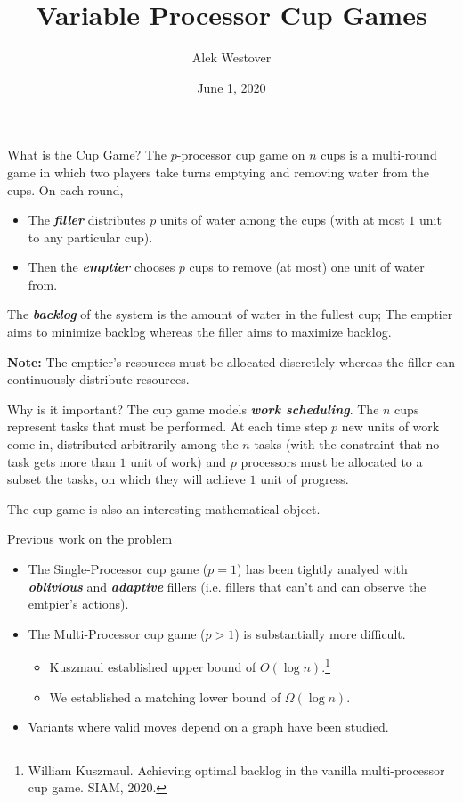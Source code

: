 \documentclass[xcolor=x11names, svgnames, rgb]{beamer}
\title{Variable Processor Cup Games}
\author{Alek Westover}
\institute{Belmont High School}
\date{June 1, 2020}
\newcommand{\defn}[1]       {{\textit{\textbf{\boldmath #1}}}}
\begin{document}
 
\frame{\titlepage}

\begin{frame}[t]{What is the Cup Game?}
  The $p$-processor cup game on $n$ cups is a multi-round game in which two
  players take turns emptying and removing water from the cups. On each round,
  \begin{itemize}
    \item The \defn{filler} distributes $p$ units of water among the cups (with at most $1$ unit to any particular cup). 
    \item Then the \defn{emptier} chooses $p$ cups to remove (at most) one unit of water from.
  \end{itemize}

  \vspace{0.4cm}

  The \defn{backlog} of the system is the amount of water in the fullest cup;
  The emptier aims to minimize backlog whereas the filler aims to maximize
  backlog.
  \vspace{0.4cm}

  \textbf{Note:} The emptier's resources must be allocated discretlely whereas
  the filler can continuously distribute resources.
\end{frame}

\begin{frame}[t]{Why is it important?}
  The cup game models \defn{work scheduling}. The $n$ cups represent tasks that
  must be performed. At each time step $p$ new units of work come in,
  distributed arbitrarily among the $n$ tasks (with the constraint that no task
  gets more than $1$ unit of work) and $p$ processors must be
  allocated to a subset the tasks, on which they will achieve $1$ unit of progress.

  \vspace{0.5cm}
  The cup game is also an interesting mathematical object.
\end{frame}

\begin{frame}[t]{Previous work on the problem}
  \begin{itemize}
    \item The Single-Processor cup game ($p=1$) has been tightly analyed with
      \defn{oblivious} and \defn{adaptive} fillers (i.e. fillers that can't and
      can observe the emtpier's actions).
    \item The Multi-Processor cup game ($p>1$) is substantially more difficult.
      \begin{itemize}
        \item Kuszmaul established upper bound of $O(\log n)$.\footnote{William Kuszmaul. Achieving optimal backlog in the vanilla multi-processor cup game. SIAM, 2020.}
        \item We established a matching lower bound of $\Omega(\log n)$.
      \end{itemize}
    \item Variants where valid moves depend on a graph have been studied.
  \end{itemize}
\end{frame}
\end{document}
